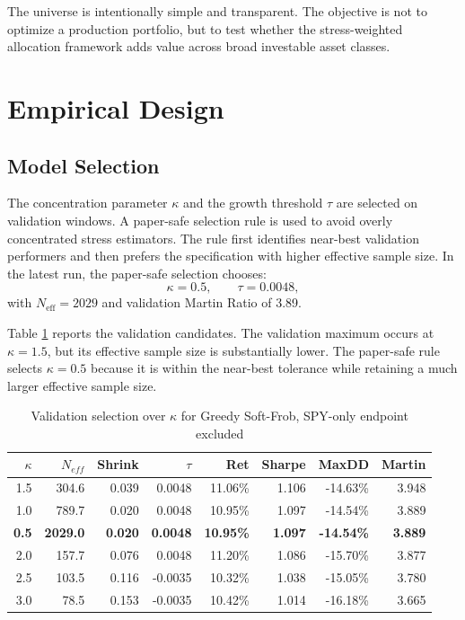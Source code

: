 \documentclass[11pt]{article}
\begin{document}
The universe is intentionally simple and transparent. The objective is not to optimize a production portfolio, but to test whether the stress-weighted allocation framework adds value across broad investable asset classes.

\section{Empirical Design}
\label{sec:empirical_design}

\subsection{Model Selection}

The concentration parameter $\kappa$ and the growth threshold $\tau$ are selected on validation windows. A paper-safe selection rule is used to avoid overly concentrated stress estimators. The rule first identifies near-best validation performers and then prefers the specification with higher effective sample size. In the latest run, the paper-safe selection chooses:
\begin{equation}
\kappa = 0.5, \qquad \tau = 0.0048,
\end{equation}
with $N_{\mathrm{eff}}=2029$ and validation Martin Ratio of 3.89.

Table \ref{tab:kappa_validation} reports the validation candidates. The validation maximum occurs at $\kappa=1.5$, but its effective sample size is substantially lower. The paper-safe rule selects $\kappa=0.5$ because it is within the near-best tolerance while retaining a much larger effective sample size.

\begin{table}[h!]
\centering
\caption{Validation selection over $\kappa$ for Greedy Soft-Frob, SPY-only endpoint excluded}
\label{tab:kappa_validation}
\begin{tabular}{rrrrrrrr}
\toprule
$\kappa$ & $N_{eff}$ & Shrink & $\tau$ & Ret & Sharpe & MaxDD & Martin \\
\midrule
1.5 & 304.6 & 0.039 & 0.0048 & 11.06\% & 1.106 & -14.63\% & 3.948 \\
1.0 & 789.7 & 0.020 & 0.0048 & 10.95\% & 1.097 & -14.54\% & 3.889 \\
\textbf{0.5} & \textbf{2029.0} & \textbf{0.020} & \textbf{0.0048} & \textbf{10.95\%} & \textbf{1.097} & \textbf{-14.54\%} & \textbf{3.889} \\
2.0 & 157.7 & 0.076 & 0.0048 & 11.20\% & 1.086 & -15.70\% & 3.877 \\
2.5 & 103.5 & 0.116 & -0.0035 & 10.32\% & 1.038 & -15.05\% & 3.780 \\
3.0 & 78.5 & 0.153 & -0.0035 & 10.42\% & 1.014 & -16.18\% & 3.665 \\
\bottomrule
\end{tabular}
\end{table}
\end{document}
